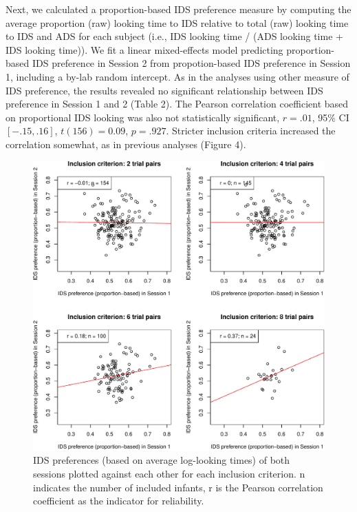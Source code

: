 \documentclass[
  man, donotrepeattitle,floatsintext]{apa6}
\begin{document}
Next, we calculated a proportion-based IDS preference measure by computing the average proportion (raw) looking time to IDS relative to total (raw) looking time to IDS and ADS for each subject (i.e., IDS looking time / (ADS looking time + IDS looking time)).
We fit a linear mixed-effects model predicting proportion-based IDS preference in Session 2 from propotion-based IDS preference in Session 1, including a by-lab random intercept.
As in the analyses using other measure of IDS preference, the results revealed no significant relationship between IDS preference in Session 1 and 2 (Table 2).
The Pearson correlation coefficient based on proportional IDS looking was also not statistically significant, \(r = .01\), 95\% CI \([-.15, .16]\), \(t(156) = 0.09\), \(p = .927\).
Stricter inclusion criteria increased the correlation somewhat, as in previous analyses (Figure 4).

\begin{figure}

{\centering \includegraphics[width=5in]{MB1T_supplement_files/figure-latex/unnamed-chunk-11-1} 

}

\caption{IDS preferences (based on average log-looking times) of both sessions plotted against each other for each inclusion criterion. n indicates the number of included infants, r is the Pearson correlation coefficient as the indicator for reliability.}\label{fig:unnamed-chunk-11}
\end{figure}
\end{document}
